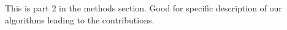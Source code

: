 This is part 2 in the methods section. Good for specific description of our algorithms leading to the contributions.